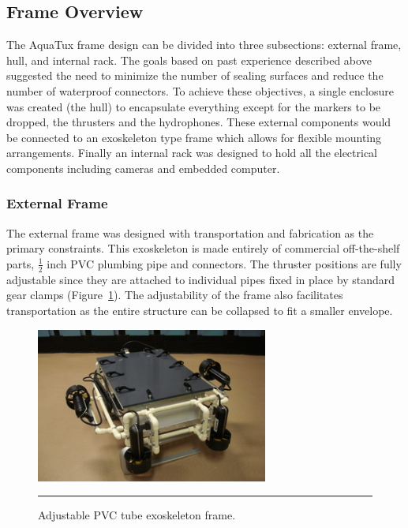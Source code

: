 \subsection{Frame Overview}
The AquaTux frame design can be divided into three
subsections: external frame, hull, and internal rack.  The goals based
on past experience described above suggested the need to
minimize the number of sealing surfaces and reduce the number of
waterproof connectors.  To achieve these objectives, a single enclosure
was created (the hull) to encapsulate everything except for the
markers to be dropped, the thrusters and the hydrophones.  These external components would be
connected to an exoskeleton type frame which allows for flexible
mounting arrangements.  Finally an internal rack was designed to hold
 all the electrical components including cameras and embedded computer.

\subsubsection{External Frame}
The external frame was designed with transportation and fabrication as
the primary constraints. This exoskeleton is made entirely of
commercial off-the-shelf
parts, $\frac{1}{2}$ inch PVC plumbing pipe and connectors.  The thruster positions
are fully adjustable since they are attached to individual pipes fixed
in place by standard gear clamps (Figure~\ref{adj}). The adjustability of the frame also
facilitates transportation as the entire structure can be collapsed to
fit a smaller envelope. 

\begin{figure}
\begin{center}
 \includegraphics[width=3in]{fig/dsc06455} 
\vspace{.05in}
\hrule
\caption{Adjustable PVC tube exoskeleton frame.}\label{adj}
\end{center}
\end{figure}


